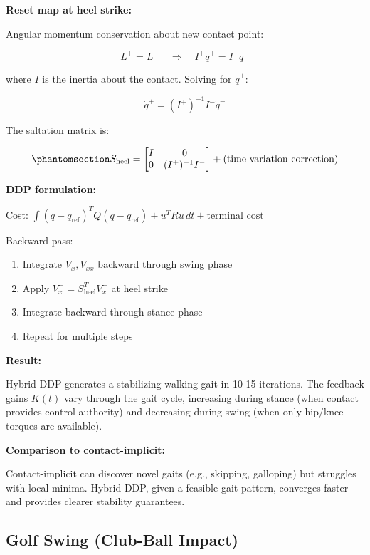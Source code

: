 \documentclass[
  letterpaper,
  DIV=11,
  numbers=noendperiod]{scrartcl}
\providecommand{\tightlist}{%
  \setlength{\itemsep}{0pt}\setlength{\parskip}{0pt}}\usepackage{longtable,booktabs,array}
\begin{document}
\textbf{Reset map at heel strike:}

Angular momentum conservation about new contact point:

\[
L^+ = L^- \quad \Rightarrow \quad I^+ \dot{q}^+ = I^- \dot{q}^-
\]

where \(I\) is the inertia about the contact. Solving for \(\dot{q}^+\):

\[
\dot{q}^+ = (I^+)^{-1} I^- \dot{q}^-
\]

The saltation matrix is:

\begin{equation}\phantomsection\label{eq-heel-strike-saltation}{
S_{\text{heel}} = \begin{bmatrix} I & 0 \\ 0 & (I^+)^{-1} I^- \end{bmatrix} + \text{(time variation correction)}
}\end{equation}

\textbf{DDP formulation:}

Cost:
\(\int (q - q_{\text{ref}})^T Q (q - q_{\text{ref}}) + u^T R u \, dt + \text{terminal cost}\)

Backward pass:

\begin{enumerate}
\def\labelenumi{\arabic{enumi}.}
\tightlist
\item
  Integrate \(V_x, V_{xx}\) backward through swing phase
\item
  Apply \(V_x^- = S_{\text{heel}}^T V_x^+\) at heel strike
\item
  Integrate backward through stance phase
\item
  Repeat for multiple steps
\end{enumerate}

\textbf{Result:}

Hybrid DDP generates a stabilizing walking gait in 10-15 iterations. The
feedback gains \(K(t)\) vary through the gait cycle, increasing during
stance (when contact provides control authority) and decreasing during
swing (when only hip/knee torques are available).

\textbf{Comparison to contact-implicit:}

Contact-implicit can discover novel gaits (e.g., skipping, galloping)
but struggles with local minima. Hybrid DDP, given a feasible gait
pattern, converges faster and provides clearer stability guarantees.

\subsection{Golf Swing (Club-Ball
Impact)}\label{golf-swing-club-ball-impact}
\end{document}
